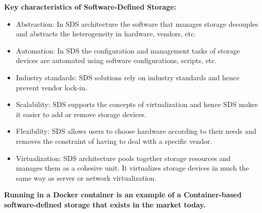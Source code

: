\documentclass[a4paper, 12pt]{article}
\begin{document}
\textbf{Key characteristics of Software-Defined Storage:}
\begin{itemize}
\item
Abstraction: In SDS architecture the software that manages storage decouples and abstracts the heterogeneity in hardware, vendors, etc.
\item
Automation: In SDS the configuration and management tasks of storage devices are automated using software configurations, scripts, etc.
\item
Industry standards: SDS solutions rely on industry standards and hence prevent vendor lock-in.
\item
Scalability: SDS supports the concepts of virtualization and hence SDS makes it easier to add or remove storage devices.
\item
Flexibility: SDS allows users to choose hardware according to their needs and removes the constraint of  having to deal with a specific vendor.
\item
Virtualization: SDS architecture pools together storage resources and manages them as a cohesive unit. It virtualizes storage devices in much the same way as server or network virtualization.
\end{itemize}

\textbf{Running in a Docker container is an example of a Container-based software-defined storage that exists in the market today.}
\end{document}
